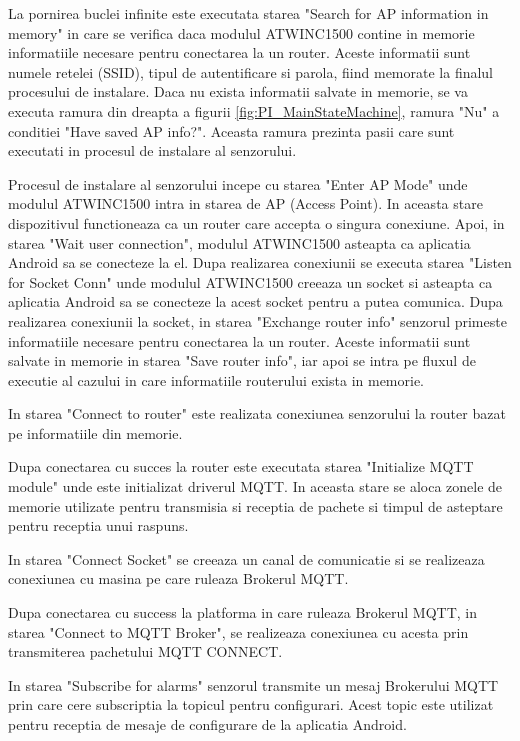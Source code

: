 La pornirea buclei infinite este executata starea "Search for AP information in memory" in care se verifica daca modulul ATWINC1500 contine in memorie informatiile 
necesare pentru conectarea la un router. Aceste informatii sunt numele retelei (SSID), tipul de autentificare si parola, fiind memorate la finalul procesului de instalare. 
Daca nu exista informatii salvate in memorie, se va executa ramura din dreapta a figurii \ref{fig:PI_MainStateMachine}, ramura "Nu" a conditiei "Have saved AP info?". 
Aceasta ramura prezinta pasii care sunt executati in procesul de instalare al senzorului.

Procesul de instalare al senzorului incepe cu starea "Enter AP Mode" unde modulul ATWINC1500 intra in starea de AP (Access Point). In aceasta stare dispozitivul 
functioneaza ca un router care accepta o singura conexiune. Apoi, in starea "Wait user connection", modulul ATWINC1500 asteapta ca aplicatia Android sa se conecteze 
la el. Dupa realizarea conexiunii se executa starea "Listen for Socket Conn" unde modulul ATWINC1500 creeaza un socket si asteapta ca aplicatia Android sa se conecteze 
la acest socket pentru a putea comunica. Dupa realizarea conexiunii la socket, in starea "Exchange router info" senzorul primeste informatiile necesare pentru conectarea 
la un router. Aceste informatii sunt salvate in memorie in starea "Save router info", iar apoi se intra pe fluxul de executie al cazului in care informatiile routerului 
exista in memorie.

In starea "Connect to router" este realizata conexiunea senzorului la router bazat pe informatiile din memorie. 

Dupa conectarea cu succes la router este executata starea "Initialize MQTT module" unde este initializat driverul MQTT. In aceasta stare se aloca zonele de memorie 
utilizate pentru transmisia si receptia de pachete si timpul de asteptare pentru receptia unui raspuns.

In starea "Connect Socket" se creeaza un canal de comunicatie si se realizeaza conexiunea cu masina pe care ruleaza Brokerul MQTT.

Dupa conectarea cu success la platforma in care ruleaza Brokerul MQTT, in starea "Connect to MQTT Broker", se realizeaza conexiunea cu acesta prin transmiterea 
pachetului MQTT CONNECT.

In starea "Subscribe for alarms" senzorul transmite un mesaj Brokerului MQTT prin care cere subscriptia la topicul pentru configurari. Acest topic este utilizat pentru 
receptia de mesaje de configurare de la aplicatia Android.

